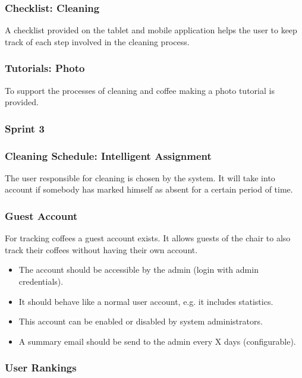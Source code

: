 \subsubsection*{Checklist: Cleaning}

A checklist provided on the tablet and mobile application helps the user
to keep track of each step involved in the cleaning process.

\subsubsection*{Tutorials: Photo}

To support the processes of cleaning and coffee making a photo tutorial
is provided.

\subsubsection{Sprint 3}\label{sprint-3}

\subsubsection*{Cleaning Schedule: Intelligent Assignment}

The user responsible for cleaning is chosen by the system. It will take
into account if somebody has marked himself as absent for a certain
period of time.

\subsubsection*{Guest Account}

For tracking coffees a guest account exists. It allows guests of the
chair to also track their coffees without having their own account.

\begin{itemize}
\item The account should be accessible by the admin (login with admin credentials).
\item It should behave like a normal user account, e.g. it includes statistics.
\item This account can be enabled or disabled by system administrators.
\item A summary email should be send to the admin every X days (configurable).
\end{itemize}

\subsubsection*{User Rankings}

